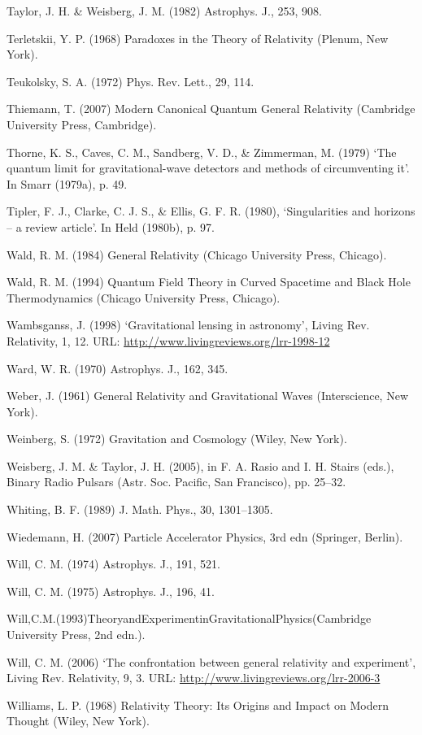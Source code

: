 {Taylor, J. H. \& Weisberg, J. M. (1982) Astrophys. J., 253, 908.


Terletskii, Y. P. (1968) Paradoxes in the Theory of Relativity (Plenum, New York).


Teukolsky, S. A. (1972) Phys. Rev. Lett., 29, 114.


Thiemann, T. (2007) Modern Canonical Quantum General Relativity (Cambridge University Press, Cambridge).


Thorne, K. S., Caves, C. M., Sandberg, V. D., \& Zimmerman, M. (1979) ‘The quantum limit for gravitational-wave detectors and methods of circumventing it’. In Smarr
(1979a), p. 49.


Tipler, F. J., Clarke, C. J. S., \& Ellis, G. F. R. (1980), ‘Singularities and horizons – a review article’. In Held (1980b), p. 97.


Wald, R. M. (1984) General Relativity (Chicago University Press, Chicago).


Wald, R. M. (1994) Quantum Field Theory in Curved Spacetime and Black Hole Thermodynamics (Chicago University Press, Chicago).


Wambsganss, J. (1998) ‘Gravitational lensing in astronomy’, Living Rev. Relativity, 1, 12.
URL: \url{http://www.livingreviews.org/lrr-1998-12}


Ward, W. R. (1970) Astrophys. J., 162, 345.


Weber, J. (1961) General Relativity and Gravitational Waves (Interscience, New York).


Weinberg, S. (1972) Gravitation and Cosmology (Wiley, New York).


Weisberg, J. M. \& Taylor, J. H. (2005), in F. A. Rasio and I. H. Stairs (eds.), Binary Radio Pulsars (Astr. Soc. Pacific, San Francisco), pp. 25–32.


Whiting, B. F. (1989) J. Math. Phys., 30, 1301–1305.


Wiedemann, H. (2007) Particle Accelerator Physics, 3rd edn (Springer, Berlin).


Will, C. M. (1974) Astrophys. J., 191, 521.


Will, C. M. (1975) Astrophys. J., 196, 41.


Will,C.M.(1993)TheoryandExperimentinGravitationalPhysics(Cambridge University Press, 2nd edn.).


Will, C. M. (2006) ‘The confrontation between general relativity and experiment’, Living Rev. Relativity, 9, 3. URL: \url{http://www.livingreviews.org/lrr-2006-3}


Williams, L. P. (1968) Relativity Theory: Its Origins and Impact on Modern Thought (Wiley, New York).


}
